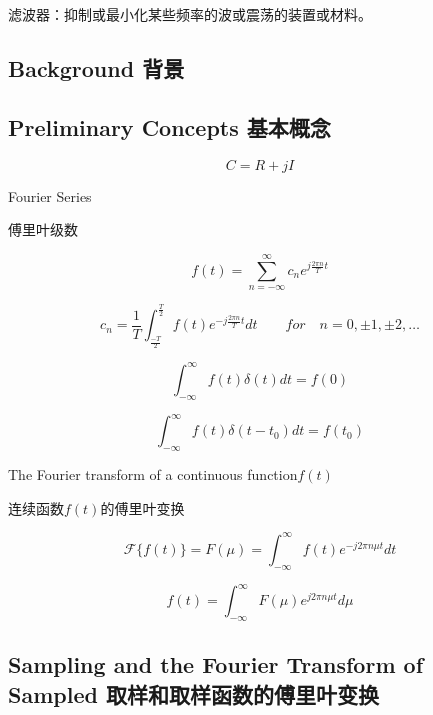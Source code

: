 \documentclass[12pt]{article}
\numberwithin{equation}{section}%
\begin{document}
滤波器：抑制或最小化某些频率的波或震荡的装置或材料。

\subsection{Background 背景}

\subsection{Preliminary Concepts 基本概念}

\begin{equation} \label{4.1}
C=R+jI
\end{equation}

Fourier Series

傅里叶级数

\begin{equation} \label{4.2}
f(t)=\sum_{n=-\infty}^{\infty}c_{n}e^{j\frac{2\pi n}{T}t}
\end{equation}

\begin{equation} \label{4.3}
c_{n}=\frac{1}{T}\int_{\frac{-T}{2}}^{\frac{T}{2}}f(t)e^{-j\frac{2\pi n}{T}t}dt \qquad  for \quad n= 0,\pm1,\pm2, \ldots
\end{equation}

\begin{equation} \label{4.4}
\int_{-\infty}^{\infty}f(t)\delta(t)dt=f(0)
\end{equation}

\begin{equation} \label{4.5}
\int_{-\infty}^{\infty}f(t)\delta(t-t_{0})dt=f(t_{0})
\end{equation}
  
The Fourier transform of a continuous function$f(t)$

连续函数$f(t)$的傅里叶变换

\begin{equation} \label{4.6}
\mathscr{F}\{f(t)\}=F(\mu)=\int_{-\infty}^{\infty}f(t)e^{-j2\pi n\mu t}dt
\end{equation}

\begin{equation} \label{4.7}
f(t)=\int_{-\infty}^{\infty}F(\mu)e^{j2\pi n\mu t}d\mu
\end{equation}

\subsection{Sampling and the Fourier Transform of Sampled 取样和取样函数的傅里叶变换}
\end{document}
